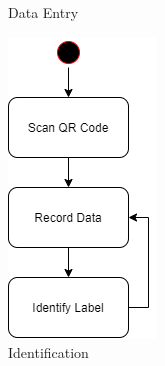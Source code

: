 \begin{figure}[h!]
\begin{minipage}{0.5\textwidth}
        \caption{Data Entry}
    \end{minipage}
    \begin{minipage}{0.5\textwidth}
        \centering
        \includegraphics[width=.8\textwidth]{charts/flow3.png}
        \caption{Identification}
    \end{minipage}
\end{figure}